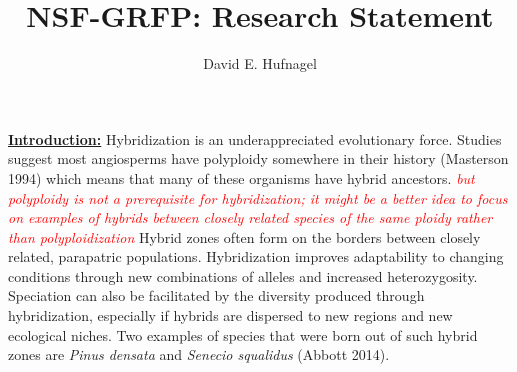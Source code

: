 \documentclass[12pt]{amsart}
\title{NSF-GRFP: Research Statement}
\author{David E. Hufnagel}
\newcommand{\mbh}[1]{\textcolor{red}{ \emph{\scriptsize  #1}} }
\begin{document}
\maketitle

\textbf{\underline{Introduction:} }
Hybridization is an underappreciated evolutionary force.
Studies suggest most angiosperms have polyploidy somewhere in their history (Masterson 1994) which means that many of these organisms have hybrid ancestors. \mbh{but polyploidy is not a prerequisite for hybridization; it might be a better idea to focus on examples of hybrids between closely related species of the same ploidy rather than polyploidization}
Hybrid zones often form on the borders between closely related, parapatric populations. %
Hybridization improves adaptability to changing conditions through new combinations of alleles and increased heterozygosity.
Speciation can also be facilitated by the diversity produced through hybridization, especially if hybrids are dispersed to new regions and new ecological niches.
Two examples of species that were born out of such hybrid zones are \textit{Pinus densata} and \textit{Senecio squalidus} (Abbott 2014).
\end{document}
